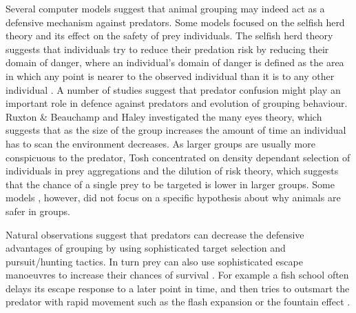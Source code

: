 Several computer models suggest that animal grouping may indeed act as a defensive mechanism against predators. Some models \cite{olson2013critical,olson2016evolution,reluga2005simulated,wood2007evolving} focused on the selfish herd theory \cite{hamilton1971geometry} and its effect on the safety of prey individuals. The selfish herd theory suggests that individuals try to reduce their predation risk by reducing their domain of danger, where an individual's domain of danger is defined as the area in which any point is nearer to the observed individual than it is to any other individual \cite{hamilton1971geometry}. A number of studies \cite{kunz2006prey,nishimura2000studying,olson2013predator,zheng2005behavior} suggest that predator confusion might play an important role in defence against predators and evolution of grouping behaviour. Ruxton \& Beauchamp \cite{ruxton2008application} and Haley\etal \cite{haley2014exploring} investigated the many eyes theory, which suggests that as the size of the group increases the amount of time an individual has to scan the environment decreases. As larger groups are usually more conspicuous to the predator, Tosh \cite{tosh2011conditions} concentrated on density dependant selection of individuals in prey aggregations and the dilution of risk theory, which suggests that the chance of a single prey to be targeted is lower in larger groups. Some models \cite{demsar2014simulated,oboshi2003collective,ward2001evolving}, however, did not focus on a specific hypothesis about why animals are safer in groups.

Natural observations \cite{cresswell2011predicting,forsman1998visual,gazda2005division,handegard2012dynamics,hector1986cooperative,nottestad2002digging,kane2014falcons,lopez2006bottlenose,rutz2012predator} suggest that predators can decrease the defensive advantages of grouping by using sophisticated target selection and pursuit/hun\-ting tactics. In turn prey can also use sophisticated escape manoeuvres to increase their chances of survival \cite{domenici2011escapology1,domenici2011escapology2}. For example a fish school often delays its escape response to a later point in time, and then tries to outsmart the predator with rapid movement such as the flash expansion or the fountain effect \cite{partridge1982structure}.


